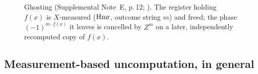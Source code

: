 \begin{figure}[H]
\centering
{}
\caption{Ghosting (Supplemental Note~E, p.\,12; \cite{luo26}). The register holding $f(x)$ is $X$-measured ($\mathrm{Hmr}$, outcome string $m$) and freed; the phase $(-1)^{m\cdot f(x)}$ it leaves is cancelled by $Z^{m}$ on a later, independently recomputed copy of $f(x)$.}
\label{fig:ghost}
\end{figure}

\subsection{Measurement-based uncomputation, in general}\label{sec:mbu}

